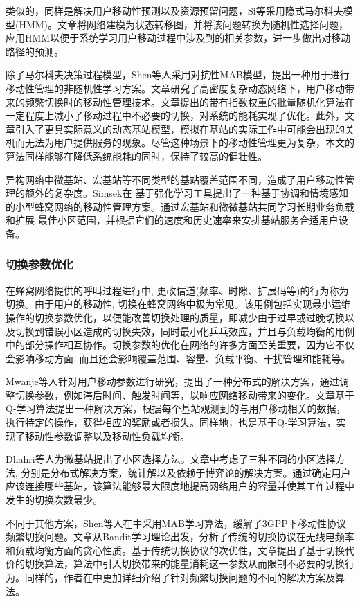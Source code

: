 \documentclass{IEEEtran}
\begin{document}
类似的，同样是解决用户移动性预测以及资源预留问题，Si等\cite{Si2010}采用隐式马尔科夫模型(HMM)。文章将网络建模为状态转移图，并将该问题转换为随机性选择问题，应用HMM以便于系统学习用户移动过程中涉及到的相关参数，进一步做出对移动路径的预测。

除了马尔科夫决策过程模型，Shen等人采用对抗性MAB模型\cite{Shen2016}，提出一种用于进行移动性管理的非随机性学习方案。文章研究了高密度复杂动态网络下，用户移动带来的频繁切换时的移动性管理技术。文章提出的带有指数权重的批量随机化算法在一定程度上减小了移动过程中不必要的切换，对系统的能耗实现了优化。此外，文章引入了更具实际意义的动态基站模型，模拟在基站的实际工作中可能会出现的关机而无法为用户提供服务的现象。尽管这种场景下的移动性管理更为复杂，本文的算法同样能够在降低系统能耗的同时，保持了较高的健壮性。

异构网络中微基站、宏基站等不同类型的基站覆盖范围不同，造成了用户移动性管理的额外的复杂度。Simsek在
\cite{Simsek2015a}基于强化学习工具提出了一种基于协调和情境感知的小型蜂窝网络的移动性管理方案。通过宏基站和微微基站共同学习长期业务负载和扩展 最佳小区范围，并根据它们的速度和历史速率来安排基站服务合适用户设备。

\subsubsection{切换参数优化}
在蜂窝网络提供的呼叫过程进行中, 更改信道(频率、时隙、扩展码等)的行为称为 切换。由于用户的移动性, 切换在蜂窝网络中极为常见。该用例包括实现最小运维操作的切换参数优化，以便能改善切换处理的质量，即减少由于过早或过晚切换以及切换到错误小区造成的切换失效，同时最小化乒乓效应，并且与负载均衡的用例中的部分操作相互协作。切换参数的优化在网络的许多方面至关重要，因为它不仅会影响移动方面, 而且还会影响覆盖范围、容量、负载平衡、干扰管理和能耗等。


Mwanje等人\cite{Mwanje2014}针对用户移动参数进行研究，提出了一种分布式的解决方案，通过调整切换参数，例如滞后时间、触发时间等，以响应网络移动带来的变化。文章基于Q-学习算法提出一种解决方案，根据每个基站观测到的与用户移动相关的数据，执行特定的操作，获得相应的奖励或者损失。同样地，\cite{Mwanje2013}也是基于Q-学习算法，实现了移动性参数调整以及移动性负载均衡。

Dhahri等人\cite{Dhahri2014}为微基站提出了小区选择方法。文章中考虑了三种不同的小区选择方法, 分别是分布式解决方案，统计解以及依赖于博弈论的解决方案。通过确定用户应该连接哪些基站，该算法能够最大限度地提高网络用户的容量并使其工作过程中发生的切换次数最少。

不同于其他方案，Shen等人在\cite{Shen2017}中采用MAB学习算法，缓解了3GPP下移动性协议频繁切换问题。文章从Bandit学习理论出发，分析了传统的切换协议在无线电频率和负载均衡方面的贪心性质。基于传统切换协议的次优性，文章提出了基于切换代价的切换算法，算法中引入切换带来的能量消耗这一参数从而限制不必要的切换行为。同样的，作者在\cite{Shen2016}中更加详细介绍了针对频繁切换问题的不同的解决方案及算法。
\end{document}

